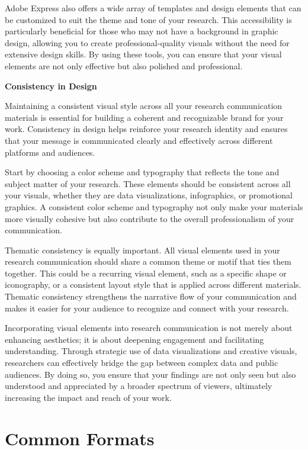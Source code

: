 \documentclass[
]{book}
\begin{document}
Adobe Express also offers a wide array of templates and design elements that can be customized to suit the theme and tone of your research. This accessibility is particularly beneficial for those who may not have a background in graphic design, allowing you to create professional-quality visuals without the need for extensive design skills. By using these tools, you can ensure that your visual elements are not only effective but also polished and professional.

\textbf{Consistency in Design}

Maintaining a consistent visual style across all your research communication materials is essential for building a coherent and recognizable brand for your work. Consistency in design helps reinforce your research identity and ensures that your message is communicated clearly and effectively across different platforms and audiences.

Start by choosing a color scheme and typography that reflects the tone and subject matter of your research. These elements should be consistent across all your visuals, whether they are data visualizations, infographics, or promotional graphics. A consistent color scheme and typography not only make your materials more visually cohesive but also contribute to the overall professionalism of your communication.

Thematic consistency is equally important. All visual elements used in your research communication should share a common theme or motif that ties them together. This could be a recurring visual element, such as a specific shape or iconography, or a consistent layout style that is applied across different materials. Thematic consistency strengthens the narrative flow of your communication and makes it easier for your audience to recognize and connect with your research.

Incorporating visual elements into research communication is not merely about enhancing aesthetics; it is about deepening engagement and facilitating understanding. Through strategic use of data visualizations and creative visuals, researchers can effectively bridge the gap between complex data and public audiences. By doing so, you ensure that your findings are not only seen but also understood and appreciated by a broader spectrum of viewers, ultimately increasing the impact and reach of your work.

\section{Common Formats}\label{common-formats}
\end{document}
